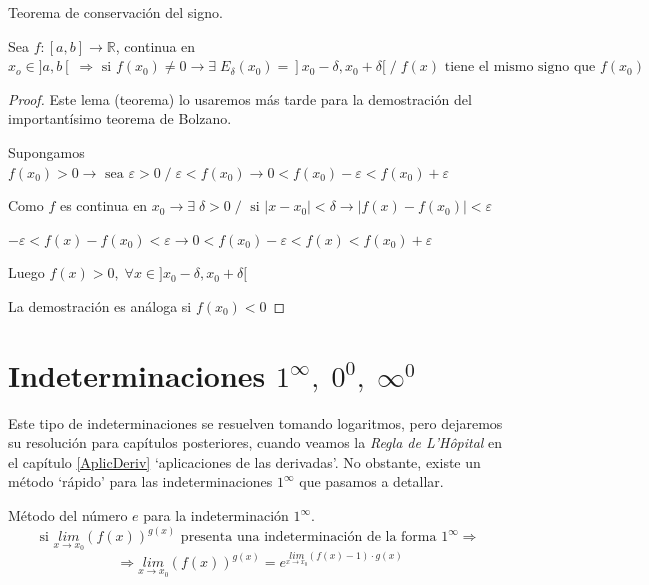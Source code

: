 	\begin{lema}Teorema de conservación del signo.
	\label{teor:conserva-signo}
	
	Sea $f:[a,b]\to \mathbb R$, continua en $x_o \in ]a,b[ \; \Rightarrow \mbox{ si } f(x_0)\neq 0 \to \exists \; E_{\delta}(x_0)=]x_0-\delta, x_0+\delta[ \;  / \; f(x) \mbox{ tiene el mismo signo que } f(x_0)$
		
	\end{lema}

	
	\begin{proof} Este lema (teorema) lo usaremos más tarde para la demostración del importantísimo teorema de Bolzano.
	
	Supongamos $f(x_0)>0 \to \mbox{ sea } \varepsilon>0 \;  / \; \varepsilon < f(x_0) \to 0<f(x_0)-\varepsilon<f(x_0)+\varepsilon$
	
	Como $f$ es continua en $x_0 \to \exists \; \delta>0 \; / \; \mbox { si } |x-x_0|<\delta \to |f(x)-f(x_0)|<\varepsilon$ 
	
	$-\varepsilon < f(x)-f(x_0) < \varepsilon \to 0<f(x_0)-\varepsilon<f(x)<f(x_0)+\varepsilon$
	
	Luego $f(x)>0, \; \forall x \in ]x_0-\delta, x_0+\delta[$
	
	La demostración es análoga si $f(x_0)<0$
		
	\end{proof}

	
	\section{Indeterminaciones $1^\infty,\; 0^0, \; \infty^0$}
	\label{sec-metodo-e}
	Este tipo de indeterminaciones se resuelven tomando logaritmos, pero dejaremos su resolución para capítulos posteriores, cuando veamos la \emph{Regla de L'Hôpital} en el capítulo \ref{AplicDeriv} `aplicaciones de las derivadas'. No obstante, existe un método `rápido' para las indeterminaciones $1^\infty$ que pasamos a detallar.
	
	\begin{teor}{Método del número $e$ para la indeterminación $1^\infty$}.
	\label{teor:metodo-numero-e}
	\begin{equation*}
		\mbox{si } \underset {x\to x_0}{lim}{{\left( f(x)\right)}^{g(x)} } \mbox{ presenta una indeterminación de la forma } 1^\infty \Rightarrow 
	\end{equation*}
		\begin{equation}
			\Rightarrow  \underset {x\to x_0}{lim}{{\left( f(x)\right)}^{g(x)} }=e^{\underset {x \to x_0}{lim}{(f(x)-1)\cdot g(x)}}	
		\end{equation}
	\end{teor}
	
